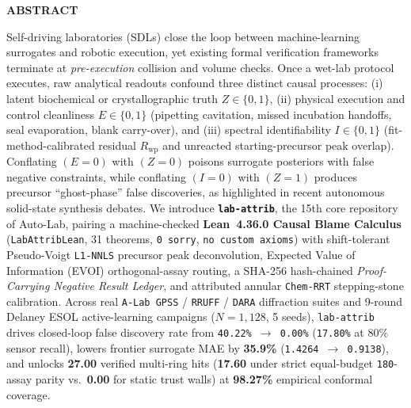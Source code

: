\documentclass[10pt,letterpaper]{article}
\begin{document}
\begin{tcolorbox}[
  enhanced,
  colback=softbg,
  colframe=linegray,
  borderline west={3pt}{0pt}{accent},
  arc=3.5pt,
  boxrule=0.55pt,
  left=10pt, right=10pt, top=6pt, bottom=6pt
]
{\footnotesize\sffamily\bfseries\textcolor{accentdeep}{ABSTRACT}}\par\vspace{2pt}
{\footnotesize\color{ink}%
Self-driving laboratories (SDLs) close the loop between machine-learning surrogates and robotic execution, yet existing formal verification frameworks terminate at \emph{pre-execution} collision and volume checks. Once a wet-lab protocol executes, raw analytical readouts confound three distinct causal processes: (i) latent biochemical or crystallographic truth $Z \in \{0,1\}$, (ii) physical execution and control cleanliness $E \in \{0,1\}$ (pipetting cavitation, missed incubation handoffs, seal evaporation, blank carry-over), and (iii) spectral identifiability $I \in \{0,1\}$ (fit-method-calibrated residual $R_{\mathrm{wp}}$ and unreacted starting-precursor peak overlap). Conflating $(E=0)$ with $(Z=0)$ poisons surrogate posteriors with false negative constraints, while conflating $(I=0)$ with $(Z=1)$ produces precursor ``ghost-phase'' false discoveries, as highlighted in recent autonomous solid-state synthesis debates. We introduce \textbf{\texttt{lab-attrib}}, the 15th core repository of Auto-Lab, pairing a machine-checked \textbf{Lean~4.36.0 Causal Blame Calculus} (\texttt{LabAttribLean}, 31 theorems, \texttt{0 sorry}, \texttt{no custom axioms}) with shift-tolerant Pseudo-Voigt \texttt{L1-NNLS} precursor peak deconvolution, Expected Value of Information (EVOI) orthogonal-assay routing, a SHA-256 hash-chained \emph{Proof-Carrying Negative Result Ledger}, and attributed annular \texttt{Chem-RRT} stepping-stone calibration. Across real \texttt{A-Lab GPSS} / \texttt{RRUFF} / \texttt{DARA} diffraction suites and 9-round Delaney ESOL active-learning campaigns ($N=1{,}128$, 5 seeds), \texttt{lab-attrib} drives closed-loop false discovery rate from \texttt{40.22\% $\to$ 0.00\%} (\texttt{17.80\%} at $80\%$ sensor recall), lowers frontier surrogate MAE by \textbf{35.9\%} (\texttt{1.4264 $\to$ 0.9138}), and unlocks \textbf{27.00} verified multi-ring hits (\textbf{17.60} under strict equal-budget \texttt{180}-assay parity vs.\ \textbf{0.00} for static trust walls) at \textbf{98.27\%} empirical conformal coverage.}


\end{tcolorbox}
\end{document}
